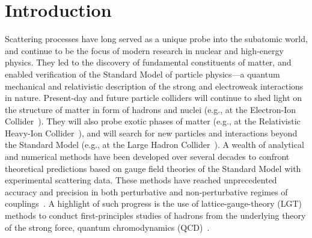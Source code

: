 \documentclass[a4paper,onecolumn,11pt,accepted=2024-10-11]{quantumarticle}
\begin{document}
\maketitle

\newpage
\tableofcontents

\section{Introduction}
\label{sec:1}
\noindent
Scattering processes have long served as a unique probe into the subatomic world, and continue to be the focus of modern research in nuclear and high-energy physics. They led to the discovery of fundamental constituents of matter, and enabled verification of the Standard Model of particle physics---a quantum mechanical and relativistic description of the strong and electroweak interactions in nature. Present-day and future particle colliders will continue to shed light on the structure of matter in form of hadrons and nuclei (e.g., at the Electron-Ion Collider~\cite{Deshpande:2005wd,Accardi:2012qut,AbdulKhalek:2021gbh,Achenbach:2023pba}). They will also probe exotic phases of matter (e.g., at the Relativistic Heavy-Ion Collider~\cite{csernai1994introduction,Bzdak:2019pkr,Achenbach:2023pba,Lovato:2022vgq}), and will search for new particles and interactions beyond the Standard Model (e.g., at the Large Hadron Collider~\cite{Narain:2022qud,Bruning:2012zz,Shiltsev:2019rfl}). A wealth of analytical and numerical methods have been developed over several decades to confront theoretical predictions based on gauge field theories of the Standard Model with experimental scattering data. These methods have reached unprecedented accuracy and precision in both perturbative and non-perturbative regimes of couplings~\cite{ParticleDataGroup:2022pth,CTEQ:1993hwr,Altarelli:1989ue,dokshitzer1991basics,FlavourLatticeAveragingGroupFLAG:2021npn}. A highlight of such progress is the use of lattice-gauge-theory (LGT) methods to conduct first-principles studies of hadrons from the underlying theory of the strong force, quantum chromodynamics (QCD)~\cite{FlavourLatticeAveragingGroupFLAG:2021npn,Davoudi:2022bnl,USQCD:2022mmc}.
\end{document}
